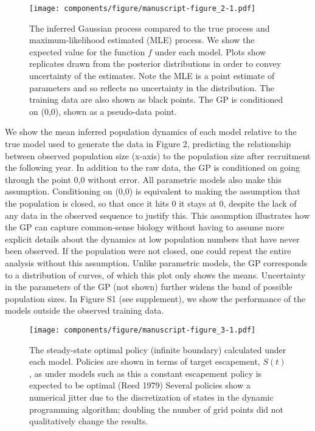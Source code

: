 \documentclass[author-year, 12pt,review]{components/elsarticle} %
\makeatletter
\def\maxwidth{\ifdim\Gin@nat@width>\linewidth\linewidth
\else\Gin@nat@width\fi}
\let\Oldincludegraphics\includegraphics
\renewcommand{\includegraphics}[1]{\Oldincludegraphics[width=\maxwidth]{#1}}
\makeatother
\begin{document}
\begin{figure}[htbp]
\centering
\texttt{[image: components/figure/manuscript-figure\_2-1.pdf]}
\caption{The inferred Gaussian process compared to the true process and
maximum-likelihood estimated (MLE) process. We show the expected value
for the function $f$ under each model. Plots show replicates drawn from
the posterior distributions in order to convey uncertainty of the
estimates. Note the MLE is a point estimate of parameters and so
reflects no uncertainty in the distribution. The training data are also
shown as black points. The GP is conditioned on (0,0), shown as a
pseudo-data point.}
\end{figure}

We show the mean inferred population dynamics of each model relative to
the true model used to generate the data in Figure 2, predicting the
relationship between observed population size (x-axis) to the population
size after recruitment the following year. In addition to the raw data,
the GP is conditioned on going through the point 0,0 without error. All
parametric models also make this assumption. Conditioning on (0,0) is
equivalent to making the assumption that the population is closed, so
that once it hits 0 it stays at 0, despite the lack of any data in the
observed sequence to justify this. This assumption illustrates how the
GP can capture common-sense biology without having to assume more
explicit details about the dynamics at low population numbers that have
never been observed. If the population were not closed, one could repeat
the entire analysis without this assumption. Unlike parametric models,
the GP corresponds to a distribution of curves, of which this plot only
shows the means. Uncertainty in the parameters of the GP (not shown)
further widens the band of possible population sizes. In Figure S1 (see
supplement), we show the performance of the models outside the observed
training data.

\begin{figure}[htbp]
\centering
\texttt{[image: components/figure/manuscript-figure\_3-1.pdf]}
\caption{The steady-state optimal policy (infinite boundary) calculated
under each model. Policies are shown in terms of target escapement,
$S(t)$, as under models such as this a constant escapement policy is
expected to be optimal (Reed 1979) Several policies show a numerical
jitter due to the discretization of states in the dynamic programming
algorithm; doubling the number of grid points did not qualitatively
change the results.}
\end{figure}
\end{document}
